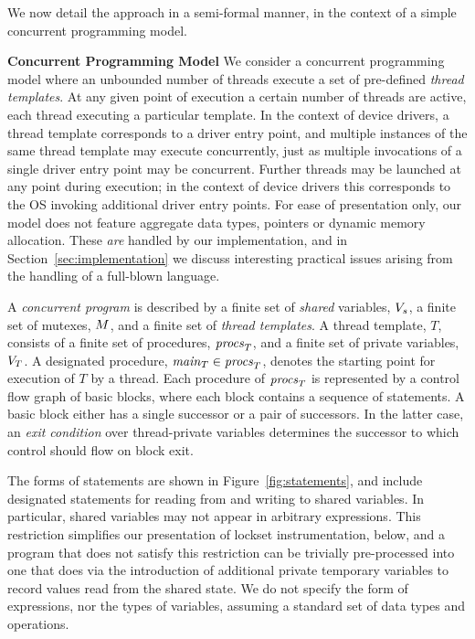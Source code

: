 We now detail the approach in a semi-formal manner, in the context of a simple concurrent programming model.

\medskip\noindent\textbf{Concurrent Programming Model }
%
We consider a concurrent programming model where an unbounded number of threads execute a set of pre-defined \emph{thread templates}.  At any given point of execution a certain number of threads are active, each thread executing a particular template.  In the context of device drivers, a thread template corresponds to a driver entry point, and multiple instances of the same thread template may execute concurrently, just as multiple invocations of a single driver entry point may be concurrent.  Further threads may be launched at any point during execution; in the context of device drivers this corresponds to the OS invoking additional driver entry points.  For ease of presentation only, our model does not feature aggregate data types, pointers or dynamic memory allocation.  These \emph{are} handled by our implementation, and in Section~\ref{sec:implementation} we discuss interesting practical issues arising from the handling of a full-blown language.

A \emph{concurrent program} is described by a finite set of \emph{shared} variables, $V_s$, a finite set of mutexes, $M$, and a finite set of \emph{thread templates}.  A thread template, $T$, consists of a finite set of procedures, $\mathit{procs}_{T}$, and a finite set of private variables, $V_{T}$.  A designated procedure, $\mathit{main}_{T} \in \mathit{procs}_{T}$, denotes the starting point for execution of $T$ by a thread.  Each procedure of $\mathit{procs}_{T}$ is represented by a control flow graph of basic blocks, where each block contains a sequence of statements.  A basic block either has a single successor or a pair of successors.  In the latter case, an \emph{exit condition} over thread-private variables determines the successor to which control should flow on block exit.

The forms of statements are shown in Figure~\ref{fig:statements}, and include designated statements for reading from and writing to shared variables.  In particular, shared variables may not appear in arbitrary expressions.  This restriction simplifies our presentation of lockset instrumentation, below, and a program that does not satisfy this restriction can be trivially pre-processed into one that does via the introduction of additional private temporary variables to record values read from the shared state.  We do not specify the form of expressions, nor the types of variables, assuming a standard set of data types and operations.

